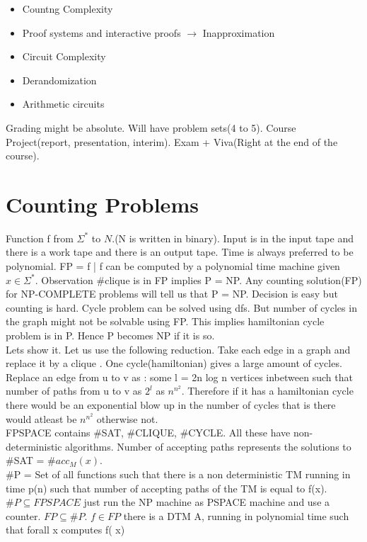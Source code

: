 \documentclass[solution,addpoints,12pt]{exam}
\begin{document}
\begin{itemize}
\item Countng Complexity
\item Proof systems and interactive proofs $\rightarrow$ Inapproximation
\item Circuit Complexity
\item Derandomization
\item Arithmetic circuits
\end{itemize}
Grading might be absolute. Will have problem sets(4 to 5). Course Project(report,
presentation, interim).
Exam + Viva(Right at the end of the course).

\section{Counting Problems}
Function f from $\Sigma^*$ to $N$.(N is written in binary).
Input is in the input tape and there is a work tape and there is an output tape.
Time is always preferred to be polynomial.
FP = f | f can be computed by a polynomial time machine given $x \in \Sigma^*$.
Observation \#clique is in FP implies P = NP. Any counting solution(FP) for NP-COMPLETE
problems will tell us that P = NP.
Decision is easy but counting is hard.
Cycle problem can be solved using dfs. But number of cycles in the graph might not be
solvable
using FP. This implies hamiltonian cycle problem is in P. Hence P becomes NP if it is
so.\\
Lets show it.
Let us use the following reduction. Take each edge in a graph and replace it by a
clique .
One cycle(hamiltonian) gives a large amount of cycles. Replace an edge from u to v as :
some l = 2n log n vertices inbetween such that number of paths from u to v as $2^l$ as
$n^{n^2}$.
Therefore if it has a hamiltonian cycle there would be an exponential blow up in the
number of cycles
that is there would atleast be $n^{n^2}$ otherwise not.\\
FPSPACE contains \#SAT, \#CLIQUE, \#CYCLE. All these have non-deterministic algorithms.
Number of accepting paths represents the solutions to \#SAT = \#$acc_M(x)$.\\
\#P = Set of all functions such that there is a non deterministic TM running in
time p(n) such that number of accepting paths of the TM is equal to f(x).\\
$\#P \subseteq FPSPACE$ just run the NP machine as PSPACE machine and use a counter.
$FP \subseteq \#P$.
$f \in FP$ there is a DTM A, running in polynomial time such that forall x computes f(
x)
\end{document}
